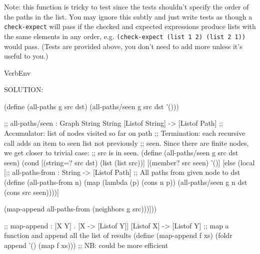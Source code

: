 \documentclass[12pt]{article}
\begin{document}
\noindent
Note: this function is tricky to test since the tests shouldn't
specify the order of the paths in the list.  You may ignore this
subtly and just write tests as though a {\tt check-expect} will pass
if the checked and expected expressions produce lists with the same
elements in any order, e.g. {\tt (check-expect (list 1 2) (list 2 1))}
would pass.  (Tests are provided above, you don't need to add more unless
it's useful to you.)



\begin{SaveVerbatim}{VerbEnv}

SOLUTION:

(define (all-paths g src dst)
  (all-paths/seen g src dst '()))

;; all-paths/seen : Graph String String [Listof String] -> [Listof Path]
;; Accumulator: list of nodes visited so far on path
;; Termination: each recursive call adds an item to seen list not previously
;; seen.  Since there are finite nodes, we get closer to trivial case:
;; src is in seen.
(define (all-paths/seen g src dst seen)
  (cond [(string=? src dst) (list (list src))]
        [(member? src seen) '()]
        [else
         (local [;; all-paths-from : String -> [Listof Path]
                 ;; All paths from given node to dst
                 (define (all-paths-from n)
                   (map (lambda (p) (cons n p))
                        (all-paths/seen g n dst (cons src seen))))]

         (map-append all-paths-from (neighbors g src)))]))

;; map-append : [X Y] . [X -> [Listof Y]] [Listof X] -> [Listof Y]
;; map a function and append all the list of results
(define (map-append f xs) (foldr append '() (map f xs)))
;; NB: could be more efficient
\end{SaveVerbatim}

\end{document}
